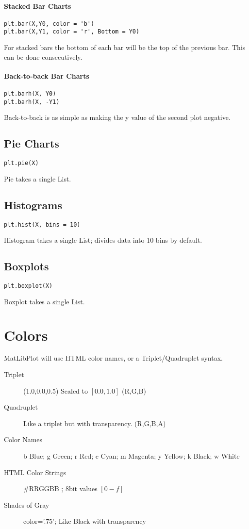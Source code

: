 \paragraph{Stacked Bar Charts}
\begin{verbatim}
plt.bar(X,Y0, color = 'b')
plt.bar(X,Y1, color = 'r', Bottom = Y0)
\end{verbatim}
For stacked bars the bottom of each bar will be the top of the previous bar.
This can be done consecutively.  

\paragraph{Back-to-back Bar Charts}
\begin{verbatim}
plt.barh(X, Y0)
plt.barh(X, -Y1)
\end{verbatim}
Back-to-back is as simple as making the y value of the second plot negative. 

\subsection{Pie Charts}
\begin{verbatim}
plt.pie(X)
\end{verbatim}
Pie takes a single List. 

\subsection{Histograms}
\begin{verbatim}
plt.hist(X, bins = 10)
\end{verbatim}
Histogram takes a single List; divides data into 10 bins by default. 

\subsection{Boxplots}
\begin{verbatim}
plt.boxplot(X)
\end{verbatim}
Boxplot takes a single List.

\section{Colors}
\label{sec:MPLColors}
MatLibPlot will use HTML color names, or a Triplet/Quadruplet syntax.
\begin{description}
	\item[Triplet] (1.0,0.0,0.5) Scaled to $[0.0,1.0]$ (R,G,B)
	\item[Quadruplet] Like a triplet but with transparency. (R,G,B,A)
	\item[Color Names] b Blue; g Green; r Red; c Cyan; m Magenta; y Yellow; k Black; w White
	\item[HTML Color Strings] \#RRGGBB ; 8bit values $[0-f]$
	\item[Shades of Gray] color='.75'; Like Black with transparency
\end{description}

